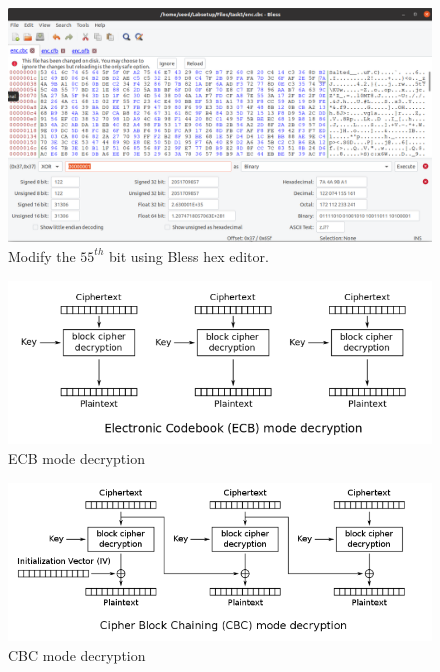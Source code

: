 \begin{figure}
    \centering
    \includegraphics[height=\textheight,width=\textwidth,keepaspectratio]
    {figures/bless_editor.png}
    \caption{Modify the \(55^{th}\) bit using Bless hex editor.}
    \label{fig:bless_editor}
\end{figure}

\begin{figure}
    \centering
    \includegraphics[height=\textheight,width=\textwidth,keepaspectratio]
    {figures/ecb_decryption.png}
    \caption{ECB mode decryption}\label{fig:ecb_dec}
\end{figure}

\begin{figure}
    \centering
    \includegraphics[height=\textheight,width=\textwidth,keepaspectratio]
    {figures/cbc_decryption.png}
    \caption{CBC mode decryption}\label{fig:cbc_dec}
\end{figure}

